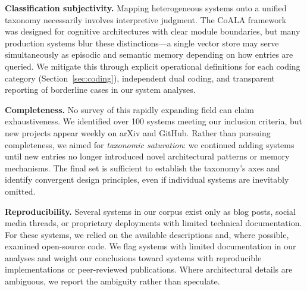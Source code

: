 \textbf{Classification subjectivity.} Mapping heterogeneous systems onto
a unified taxonomy necessarily involves interpretive judgment. The CoALA
framework~\cite{sumers2024coala} was designed for cognitive architectures
with clear module boundaries, but many production systems blur these
distinctions---a single vector store may serve simultaneously as episodic
and semantic memory depending on how entries are queried. We mitigate this
through explicit operational definitions for each coding category
(Section~\ref{sec:coding}), independent dual coding, and transparent
reporting of borderline cases in our system analyses.

\textbf{Completeness.} No survey of this rapidly expanding field can
claim exhaustiveness. We identified over 100 systems meeting our inclusion
criteria, but new projects appear weekly on arXiv and GitHub. Rather than
pursuing completeness, we aimed for \emph{taxonomic saturation}: we
continued adding systems until new entries no longer introduced novel
architectural patterns or memory mechanisms. The final set is sufficient
to establish the taxonomy's axes and identify convergent design principles,
even if individual systems are inevitably omitted.

\textbf{Reproducibility.} Several systems in our corpus exist only as
blog posts, social media threads, or proprietary deployments with limited
technical documentation. For these systems, we relied on the available
descriptions and, where possible, examined open-source code. We flag
systems with limited documentation in our analyses and weight our
conclusions toward systems with reproducible implementations or
peer-reviewed publications. Where architectural details are ambiguous, we
report the ambiguity rather than speculate.

